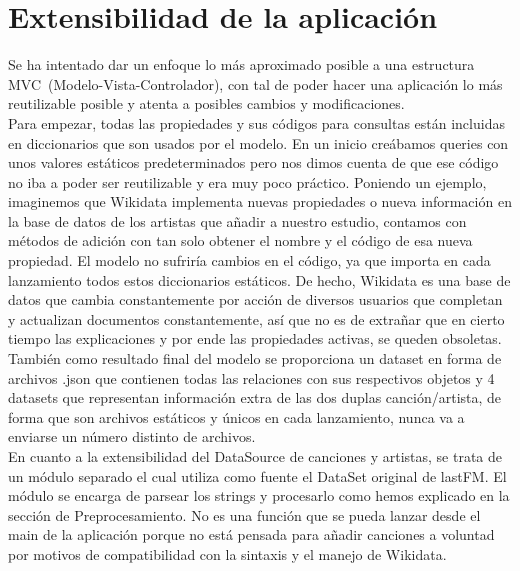 \section{Extensibilidad de la aplicación}

Se ha intentado dar un enfoque lo más aproximado posible a una estructura MVC~(Modelo-Vista-Controlador), con tal de poder hacer una aplicación lo más reutilizable posible y atenta a posibles cambios y modificaciones.\\

Para empezar, todas las propiedades y sus códigos para consultas están incluidas en diccionarios que son usados por el modelo. En un inicio creábamos queries con unos valores estáticos predeterminados pero nos dimos cuenta de que ese código no iba a poder ser reutilizable y era muy poco práctico. Poniendo un ejemplo, imaginemos que Wikidata implementa nuevas propiedades o nueva información en la base de datos de los artistas que añadir a nuestro estudio, contamos con métodos de adición con tan solo obtener el nombre y el código de esa nueva propiedad. El modelo no sufriría cambios en el código, ya que importa en cada lanzamiento todos estos diccionarios estáticos. De hecho, Wikidata es una base de datos que cambia constantemente por acción de diversos usuarios que completan y actualizan documentos constantemente, así que no es de extrañar que en cierto tiempo las explicaciones y por ende las propiedades activas, se queden obsoletas.\\

También como resultado final del modelo se proporciona un dataset en forma de archivos .json que contienen todas las relaciones con sus respectivos objetos y 4 datasets que representan información extra de las dos duplas canción/artista, de forma que son archivos estáticos y únicos en cada lanzamiento, nunca va a enviarse un número distinto de archivos.\\

En cuanto a la extensibilidad del DataSource de canciones y artistas, se trata de un módulo separado el cual utiliza como fuente el DataSet original de lastFM. El módulo se encarga de parsear los strings y procesarlo como hemos explicado en la sección de Preprocesamiento. No es una función que se pueda lanzar desde el main de la aplicación porque no está pensada para añadir canciones a voluntad por motivos de compatibilidad con la sintaxis y el manejo de Wikidata.


